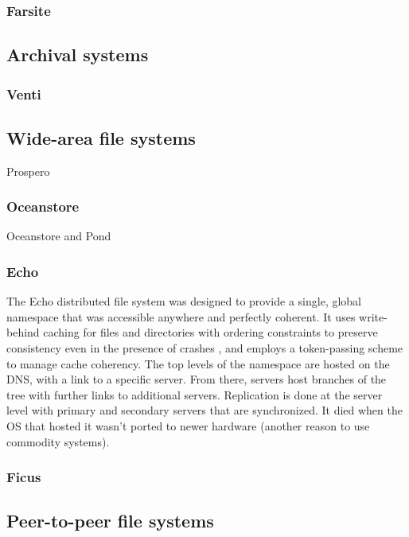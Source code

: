 \subsubsection{Farsite}
\cite{bolosky,adya}

\subsection{Archival systems}

\subsubsection{Venti}
\cite{quinlan}

\subsection{Wide-area file systems}
Prospero \cite{neuman}

\subsubsection{Oceanstore}
Oceanstore and Pond \cite{kubiatowicz,rhea}

\subsubsection{Echo}

The Echo distributed file system \cite{birrell93} was designed to provide a single, global namespace that was accessible anywhere and perfectly coherent. It uses write-behind caching for files and directories with ordering constraints to preserve consistency even in the presence of crashes \cite{mann}, and employs a token-passing scheme to manage cache coherency. The top levels of the namespace are hosted on the DNS, with a link to a specific server. From there, servers host branches of the tree with further links to additional servers. Replication is done at the server level with primary and secondary servers that are synchronized. It died when the OS that hosted it wasn't ported to newer hardware (another reason to use commodity systems).

\subsubsection{Ficus}
\cite{popek}

\subsection{Peer-to-peer file systems}
